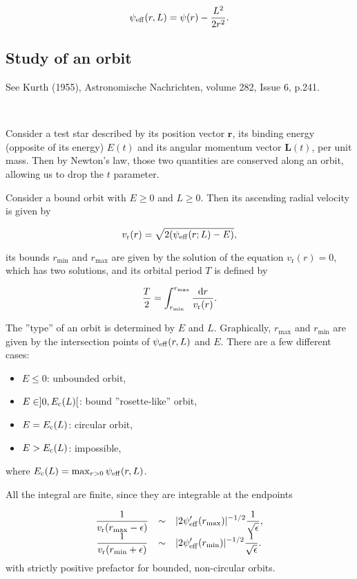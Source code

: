 \documentclass[11pt]{article}
\newcommand{\rr}{\mathrm{r}}
\newcommand{\vr}{v_{\rr}}
\newcommand{\br}{\boldsymbol{r}}
\newcommand{\rd}{{\rm{d}}}
\newcommand{\rmax}{r_{\max}}
\newcommand{\rmin}{r_{\min}}
\newcommand{\psieff}{\psi_{\rm{eff}}}
\newcommand{\bL}{\boldsymbol{L}}
\newcommand{\Ec}{E_{{\rm{c}}}}
\begin{document}
\begin{equation}
  \psieff(r,L) = \psi(r) - \frac{L^{2}}{2r^{2}} .
  \label{eq:Effective_potential}
  \end{equation}

\subsection{Study of an orbit}
\label{subsec:OrbitGlobular}

See Kurth (1955), Astronomische Nachrichten, volume 282, Issue
6, p.241.

~

Consider a test star described by its position vector $\br$,
its binding energy (opposite of its energy) $E(t)$ and its angular
momentum vector $\bL(t)$, per unit mass. Then by Newton's law, those two quantities are conserved along an orbit, allowing us to drop the $t$ parameter.

Consider a bound orbit with $E\geq 0$ and $L \geq 0$. Then its ascending radial velocity is given by

\begin{equation}
  \vr(r) = \sqrt{2(\psieff(r;L)-E)} ,
  \label{eq:radial_velocity}
\end{equation}

its bounds $\rmin$ and $\rmax$ are given by the solution of the equation $\vr(r)=0$, which has two solutions, and its orbital period $T$ is defined by

\begin{equation}
 \frac{T}{2}=\int_{\rmin}^{\rmax}\frac{{\rd}r}{\vr(r)} .
  \label{eq:orbital_period}
  \end{equation}

The ''type'' of an orbit is determined by $E$ and $L$. Graphically, $\rmax$ and $\rmin$ are given by the intersection points of $\psieff(r,L)$ and $E$. There are a few different cases:
\begin{itemize}
\item $E \leq 0$: unbounded orbit,
\item $E \in ]0,\Ec(L)[$: bound ''rosette-like'' orbit,
\item $E = \Ec(L)$: circular orbit,
\item $E > \Ec(L)$: impossible,
\end{itemize}
where $\Ec(L) = \max_{r>0}\psieff(r,L)$.

All the integral are finite, since they are integrable at the endpoints

\begin{equation}
\begin{array}{ccl}
 \displaystyle{\frac{1}{\vr(\rmax-\epsilon)}} & \sim& \displaystyle{|2\psi_{{\rm eff}}'(r_{\max})|^{-1/2}\frac{1}{\sqrt{\epsilon}}} ,\\
  
 \displaystyle{\frac{1}{\vr(\rmin+\epsilon)}} & \sim&\displaystyle{|2\psi_{{\rm eff}}'(r_{\min})|^{-1/2}\frac{1}{\sqrt{\epsilon}}} .
\end{array}
\label{eq:integrable_T}
\end{equation}
with strictly positive prefactor for bounded, non-circular orbits.
\end{document}
